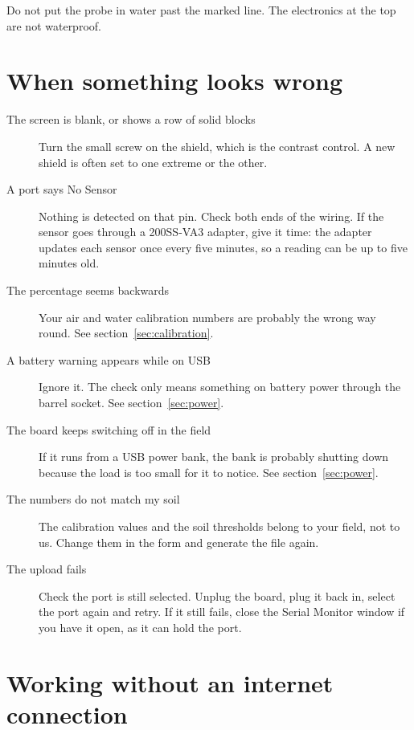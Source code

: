 \documentclass[11pt,a4paper]{article}
\newenvironment{caution}
  {\par\medskip\noindent
   \begin{lrbox}{\nfbox}\begin{minipage}{0.94\linewidth}\vspace{2pt}}
  {\vspace{2pt}\end{minipage}\end{lrbox}%
   \fcolorbox{warn}{white}{\usebox{\nfbox}}\par\medskip}
\begin{document}
\begin{caution}
Do not put the probe in water past the marked line. The electronics at the top
are not waterproof.
\end{caution}

\section{When something looks wrong}

\begin{description}
  \item[The screen is blank, or shows a row of solid blocks]
        Turn the small screw on the shield, which is the contrast control. A
        new shield is often set to one extreme or the other.
  \item[A port says No Sensor]
        Nothing is detected on that pin. Check both ends of the wiring. If the
        sensor goes through a 200SS-VA3 adapter, give it time: the adapter
        updates each sensor once every five minutes, so a reading can be up to
        five minutes old.
  \item[The percentage seems backwards]
        Your air and water calibration numbers are probably the wrong way
        round. See section~\ref{sec:calibration}.
  \item[A battery warning appears while on USB]
        Ignore it. The check only means something on battery power through the
        barrel socket. See section~\ref{sec:power}.
  \item[The board keeps switching off in the field]
        If it runs from a USB power bank, the bank is probably shutting down
        because the load is too small for it to notice. See
        section~\ref{sec:power}.
  \item[The numbers do not match my soil]
        The calibration values and the soil thresholds belong to your field,
        not to us. Change them in the form and generate the file again.
  \item[The upload fails]
        Check the port is still selected. Unplug the board, plug it back in,
        select the port again and retry. If it still fails, close the Serial
        Monitor window if you have it open, as it can hold the port.
\end{description}

\section{Working without an internet connection}
\end{document}
